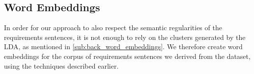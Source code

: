 \subsection{Word Embeddings}
In order for our approach to also respect the semantic regularities of the requirements sentences, it is not enough to rely on the clusters generated by the LDA, as mentioned in \autoref{sub:back_word_embeddings}. We therefore create word embeddings for the corpus of requirements sentences we derived from the \crowdre{} dataset, using the techniques described earlier.



